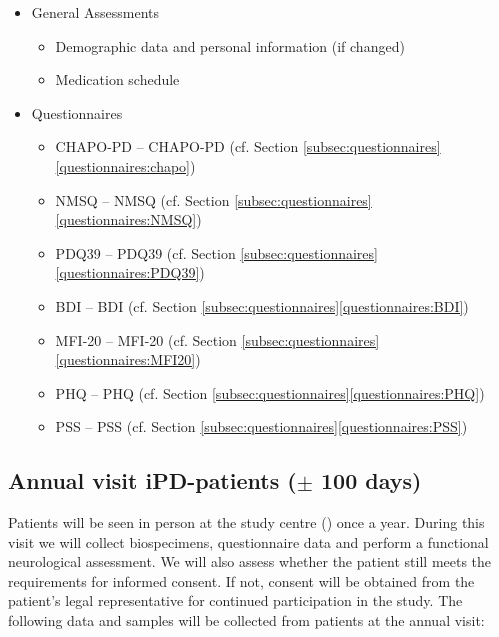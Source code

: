 \begin{itemize}[noitemsep,topsep=0pt]
\item General Assessments
\begin{itemize}[noitemsep,topsep=0pt]
\item Demographic data and personal information (if changed)
\item Medication schedule
\end{itemize}
\item Questionnaires
\begin{itemize}[noitemsep,topsep=0pt]
\item \acl{CHAPO-PD} -- \acs{CHAPO-PD} (cf. Section \ref{subsec:questionnaires}\ref{questionnaires:chapo})
\item \acl{NMSQ} -- \acs{NMSQ} (cf. Section \ref{subsec:questionnaires}\ref{questionnaires:NMSQ})
\item \acl{PDQ39} -- \acs{PDQ39} (cf. Section \ref{subsec:questionnaires}\ref{questionnaires:PDQ39})
\item \acl{BDI} -- \acs{BDI} (cf. Section \ref{subsec:questionnaires}\ref{questionnaires:BDI})
\item \acl{MFI-20} -- \acs{MFI-20} (cf. Section \ref{subsec:questionnaires}\ref{questionnaires:MFI20})
\item \acl{PHQ} -- \acs{PHQ} (cf. Section \ref{subsec:questionnaires}\ref{questionnaires:PHQ})
\item \acl{PSS} -- \acs{PSS} (cf. Section \ref{subsec:questionnaires}\ref{questionnaires:PSS})
\end{itemize}
\end{itemize}

\subsection{Annual visit \ac{iPD}-patients ($\pm$ 100 days)}
Patients will be seen in person at the study centre (\UKM) once a year. During this visit we will collect biospecimens, questionnaire data and perform a functional neurological assessment. We will also assess whether the patient still meets the requirements for informed consent. If not, consent will be obtained from the patient's legal representative for continued participation in the study. The following data and samples will be collected from patients at the annual visit:

